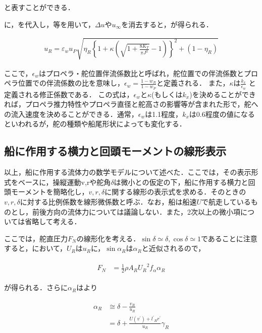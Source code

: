 と表すことができる．

に，を代入し，等を用いて，$\Delta u$や$u_\infty$を消去すると，が得られる．


\begin{align}
    u_{R}=\varepsilon_{w} u_{P} \sqrt{\eta_{R}\left\{1+\kappa\left(\sqrt{1+\frac{8 K_{T}}{\pi J^{2}}}-1\right)\right\}^{2}+\left(1-\eta_{R}\right)} \label{eq:2-46}
\end{align}

ここで，$\epsilon_w$はプロペラ・舵位置伴流係数比と呼ばれ，舵位置での伴流係数とプロペラ位置での伴流係数の比を意味し，$\epsilon_w=\frac{1-w_R}{1-w_P}$と定義される．
また，$\kappa$は$\frac{k_x}{\epsilon_w}$ と定義される修正係数である．
この式は，$\epsilon_w$と$\kappa$(もしくは$k_x$)を決めることができれば，プロペラ推力特性やプロペラ直径と舵高さの影響等が含まれた形で，舵への流入速度を決めることができる．通常，$\epsilon_w$は1.1程度，$k_x$は0.6程度の値になるといわれるが，舵の種類や船尾形状によっても変化する．

\subsection{船に作用する横力と回頭モーメントの線形表示}

以上，船に作用する流体力の数学モデルについて述べた．ここでは，その表示形式をベースに，操縦運動v,rや舵角$\delta$は微小との仮定の下，船に作用する横力と回頭モーメントを簡略化し，$v,r,\delta$に関する線形の表示式を求める．そのときの$v,r,\delta$に対する比例係数を線形微係数と呼ぶ．なお，船は船速$U$で航走しているものとし，前後方向の流体力については議論しない．また，2次以上の微小項については省略して考える．

ここでは，舵直圧力$F_N$の線形化を考える．$\sin{\delta} \simeq \delta, \cos{\delta} \simeq 1$であることに注意すると，において，$U_R$は$u_R$に，$\sin{\alpha_R}$は$\alpha_R$と近似されるので，

\begin{align}
    \begin{split}
        F_N &= \frac{1}{2} \rho A_R {U_R}^2 f_\alpha \alpha_R  \label{eq:2-47}
    \end{split}
\end{align}

が得られる．さらに$\alpha_R$はより

\begin{align}
    \begin{split}
        \alpha_R &\cong \delta - \frac{v_R}{u_R} \\
        &= \delta + \frac{U (v^{\prime}) + {l^{\prime}}_R r^{\prime}}{u_R} \gamma_R \label{eq:2-48}
    \end{split}
\end{align}

